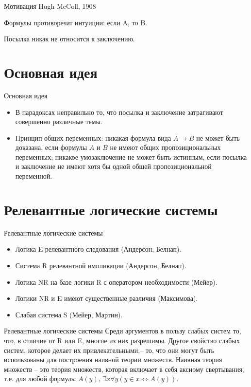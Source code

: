 \documentclass[14pt]{beamer}
\begin{document}
\begin{frame}[nologo]{Мотивация}
	Hugh McColl, 1908
	
	Формулы противоречат интуиции: если A, то B.
	
	Посылка никак не относится к заключению.
\end{frame}

\section{Основная идея}

\begin{frame}[nologo]{Основная идея}
	\begin{itemize}
		\item В парадоксах неправильно то, что посылка и заключение затрагивают 
		совершенно различные темы.
		\item Принцип общих переменных: никакая формула вида $ A \rightarrow B 
		$ не может быть доказана, если формулы $ A $ и $ B $ не имеют общих 
		пропозициональных переменных; никакое умозаключение не может быть 
		истинным, если посылка и заключение не имеют хотя бы одной общей 
		пропозициональной переменной.
	\end{itemize}
\end{frame}

\section{Релевантные логические системы}

\begin{frame}[nologo]{Релевантные логические системы}
\begin{itemize}
	\item Логика E релевантного следования (Андерсон, Белнап).
	\item Система R релевантной импликации (Андерсон, Белнап).
	\item Логика NR на базе логики R с оператором необходимости (Мейер).
	\item Логики NR и E имеют существенные различия (Максимова).
	\item Слабая система S (Мейер, Мартин).
\end{itemize}
\end{frame}

\begin{frame}[nologo]{Релевантные логические системы}
Среди аргументов в пользу слабых систем то, что, в отличие от R или E, многие 
из них разрешимы. Другое свойство слабых систем, которое делает их 
привлекательными,-- то, что они могут быть использованы для построения наивной 
теории множеств. Наивная теория множеств -- это теория множеств, которая 
включает в себя аксиому свертывания, т.е. для любой формулы $A(y)$, $\exists x 
\forall y (y \in x \Leftrightarrow A(y))$.
\end{frame}
\end{document}
